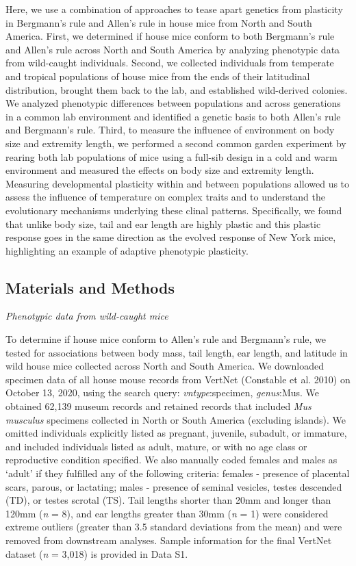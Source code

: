 \documentclass[
]{article}
\begin{document}
Here, we use a combination of approaches to tease apart genetics from
plasticity in Bergmann's rule and Allen's rule in house mice from North
and South America. First, we determined if house mice conform to both
Bergmann's rule and Allen's rule across North and South America by
analyzing phenotypic data from wild-caught individuals. Second, we
collected individuals from temperate and tropical populations of house
mice from the ends of their latitudinal distribution, brought them back
to the lab, and established wild-derived colonies. We analyzed
phenotypic differences between populations and across generations in a
common lab environment and identified a genetic basis to both Allen's
rule and Bergmann's rule. Third, to measure the influence of environment
on body size and extremity length, we performed a second common garden
experiment by rearing both lab populations of mice using a full-sib
design in a cold and warm environment and measured the effects on body
size and extremity length. Measuring developmental plasticity within and
between populations allowed us to assess the influence of temperature on
complex traits and to understand the evolutionary mechanisms underlying
these clinal patterns. Specifically, we found that unlike body size,
tail and ear length are highly plastic and this plastic response goes in
the same direction as the evolved response of New York mice,
highlighting an example of adaptive phenotypic plasticity.

\vspace{5mm}

\hypertarget{materials-and-methods}{%
\subsection{Materials and Methods}\label{materials-and-methods}}

\noindent\emph{Phenotypic data from wild-caught mice}

To determine if house mice conform to Allen's rule and Bergmann's rule,
we tested for associations between body mass, tail length, ear length,
and latitude in wild house mice collected across North and South
America. We downloaded specimen data of all house mouse records from
VertNet (Constable et al. 2010) on October 13, 2020, using the search
query: \emph{vntype}:specimen, \emph{genus}:Mus. We obtained 62,139
museum records and retained records that included \emph{Mus musculus}
specimens collected in North or South America (excluding islands). We
omitted individuals explicitly listed as pregnant, juvenile, subadult,
or immature, and included individuals listed as adult, mature, or with
no age class or reproductive condition specified. We also manually coded
females and males as `adult' if they fulfilled any of the following
criteria: females - presence of placental scars, parous, or lactating;
males - presence of seminal vesicles, testes descended (TD), or testes
scrotal (TS). Tail lengths shorter than 20mm and longer than 120mm
(\emph{n} = 8), and ear lengths greater than 30mm (\emph{n} = 1) were
considered extreme outliers (greater than 3.5 standard deviations from
the mean) and were removed from downstream analyses. Sample information
for the final VertNet dataset (\emph{n} = 3,018) is provided in Data S1.
\end{document}
